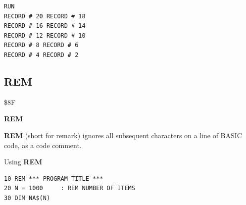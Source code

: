 \begin{description}[leftmargin=2cm,style=nextline]
\begin{tcolorbox}[colback=black,coltext=white]
\begin{verbatim}
RUN
RECORD # 20 RECORD # 18
RECORD # 16 RECORD # 14
RECORD # 12 RECORD # 10
RECORD # 8 RECORD # 6
RECORD # 4 RECORD # 2
\end{verbatim}
\end{tcolorbox}
\end{description}


\newpage
\subsection{REM}
\begin{description}[leftmargin=2cm,style=nextline]
\item [Token:]    \$8F

\item [Format:]   {\bf REM}

\item [Usage:]    {\bf REM} (short for remark) ignores all subsequent characters on a line of BASIC code, as a code comment.

\item [Example:]  Using {\bf REM}

\begin{tcolorbox}[colback=black,coltext=white]
\verbatimfont{\codefont}
\begin{verbatim}
10 REM *** PROGRAM TITLE ***
20 N = 1000     : REM NUMBER OF ITEMS
30 DIM NA$(N)
\end{verbatim}
\end{tcolorbox}
\end{description}


\newpage

